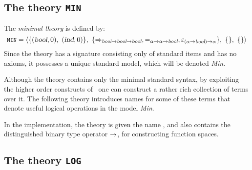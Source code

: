 \subsection{The theory {\tt MIN}}
\label{sec:min-thy}

The {\it minimal theory\/}  is defined by:
\[
\hbox{{\small\tt MIN}} =
\langle\{(\textsl{bool},0),\ (\textsl{ind},0)\},\
 \{\Rightarrow_{\textsl{bool}{\to}\textsl{bool}{\to}\textsl{bool}},
=_{\alpha{\to}\alpha{\to}\textsl{bool}},
\varepsilon_{(\alpha{\to}\textsl{bool}){\to}\alpha}\},\
\{\},\ \{\}\rangle
\]
Since the theory  has a signature consisting only of
standard items and has no axioms, it possesses a unique standard model,
which will be denoted {\em Min}.

Although the theory  contains only the minimal standard
syntax, by exploiting the higher order constructs of \HOL\ one can
construct a rather rich collection of terms over it. The following
theory introduces names for some of these terms that denote useful
logical operations in the model {\em Min}.

In the implementation, the theory  is given the name
, and also contains the distinguished binary type
operator ${\to}$, for constructing function spaces.

\subsection{The theory {\tt LOG}}
\label{LOG}

